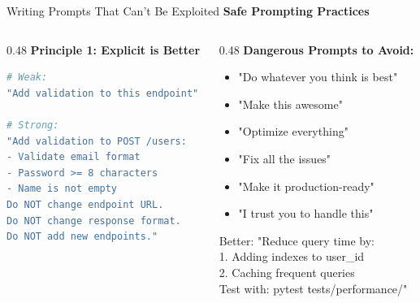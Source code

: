 \documentclass[aspectratio=169,11pt]{beamer}
\begin{document}
\begin{frame}[fragile]{Writing Prompts That Can't Be Exploited}
    \textbf{Safe Prompting Practices}

    \begin{columns}[T]
        \begin{column}{0.48\textwidth}
            \textbf{Principle 1: Explicit is Better}
            \begin{lstlisting}[language=Bash]
# Weak:
"Add validation to this endpoint"

# Strong:
"Add validation to POST /users:
- Validate email format
- Password >= 8 characters
- Name is not empty
Do NOT change endpoint URL.
Do NOT change response format.
Do NOT add new endpoints."
            \end{lstlisting}
        \end{column}
        \begin{column}{0.48\textwidth}
            \textbf{Dangerous Prompts to Avoid:}
            \begin{itemize}
                \item[\textcolor{UofSCRose}{\texttimes}] "Do whatever you think is best"
                \item[\textcolor{UofSCRose}{\texttimes}] "Make this awesome"
                \item[\textcolor{UofSCRose}{\texttimes}] "Optimize everything"
                \item[\textcolor{UofSCRose}{\texttimes}] "Fix all the issues"
                \item[\textcolor{UofSCRose}{\texttimes}] "Make it production-ready"
                \item[\textcolor{UofSCRose}{\texttimes}] "I trust you to handle this"
            \end{itemize}

            \begin{exampleblock}{Better:}
                "Reduce query time by:\\
                1. Adding indexes to user\_id\\
                2. Caching frequent queries\\
                Test with: pytest tests/performance/"
            \end{exampleblock}
        \end{column}
    \end{columns}
\end{frame}
\end{document}
